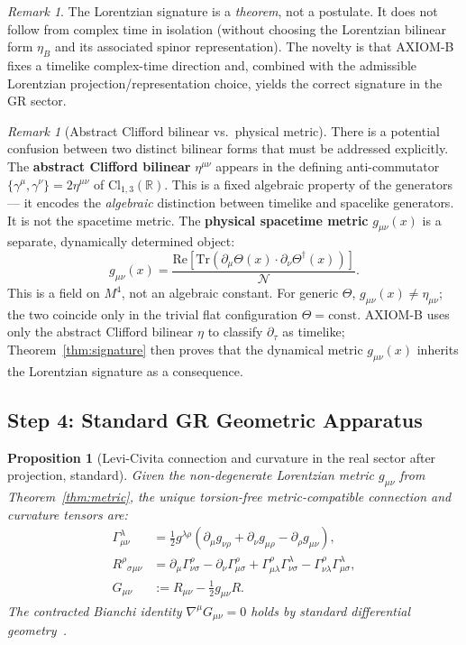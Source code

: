 \documentclass[12pt,a4paper]{article}
\newtheorem{proposition}[theorem]{Proposition}
\theoremstyle{definition}
\theoremstyle{remark}
\newtheorem{remark}[theorem]{Remark}
\newcommand{\RR}{\mathbb{R}}
\newcommand{\Tr}{\mathrm{Tr}}
\newcommand{\re}{\mathrm{Re}}
\newcommand{\calN}{\mathcal{N}}
\begin{document}
\begin{remark}
The Lorentzian signature is a \emph{theorem}, not a postulate.
It does not follow from complex time in isolation (without choosing the
Lorentzian bilinear form $\eta_B$ and its associated spinor representation).
The novelty is that AXIOM-B fixes a timelike complex-time direction and,
combined with the admissible Lorentzian projection/representation choice,
yields the correct signature in the GR sector.
\end{remark}

\begin{remark}[Abstract Clifford bilinear vs.\ physical metric]
\label{rem:clifford_vs_metric}
There is a potential confusion between two distinct bilinear forms that must
be addressed explicitly.
The \textbf{abstract Clifford bilinear} $\eta^{\mu\nu}$ appears in the
defining anti-commutator $\{\gamma^\mu,\gamma^\nu\} = 2\eta^{\mu\nu}$ of
$\mathrm{Cl}_{1,3}(\RR)$.
This is a fixed algebraic property of the generators --- it encodes the
\emph{algebraic} distinction between timelike and spacelike generators.
It is not the spacetime metric.
The \textbf{physical spacetime metric} $g_{\mu\nu}(x)$ is a separate,
dynamically determined object:
\[
  g_{\mu\nu}(x)
  = \frac{\re[\Tr(\partial_\mu\Theta(x) \cdot \partial_\nu\Theta^\dagger(x))]}{\calN}.
\]
This is a field on $M^4$, not an algebraic constant.
For generic $\Theta$, $g_{\mu\nu}(x) \neq \eta_{\mu\nu}$; the two coincide
only in the trivial flat configuration $\Theta = \mathrm{const}$.
AXIOM-B uses only the abstract Clifford bilinear $\eta$ to classify
$\partial_\tau$ as timelike; Theorem~\ref{thm:signature} then proves that
the dynamical metric $g_{\mu\nu}(x)$ inherits the Lorentzian signature
as a consequence.
\end{remark}

\subsection{Step 4: Standard GR Geometric Apparatus}
\label{sec:step4}

\begin{proposition}[Levi-Civita connection and curvature in the real sector after projection, standard]
\label{prop:geometry}
Given the non-degenerate Lorentzian metric $g_{\mu\nu}$ from
Theorem~\ref{thm:metric}, the unique torsion-free metric-compatible connection
and curvature tensors are:
\begin{align}
  \Gamma^\lambda_{\mu\nu}
    &= \tfrac{1}{2}g^{\lambda\rho}
       (\partial_\mu g_{\nu\rho} + \partial_\nu g_{\mu\rho}
        - \partial_\rho g_{\mu\nu}), \\
  R^\rho{}_{\sigma\mu\nu}
    &= \partial_\mu\Gamma^\rho_{\nu\sigma}
       - \partial_\nu\Gamma^\rho_{\mu\sigma}
       + \Gamma^\rho_{\mu\lambda}\Gamma^\lambda_{\nu\sigma}
       - \Gamma^\rho_{\nu\lambda}\Gamma^\lambda_{\mu\sigma}, \\
  G_{\mu\nu}
    &:= R_{\mu\nu} - \tfrac{1}{2}g_{\mu\nu}R.
\end{align}
The contracted Bianchi identity $\nabla^\mu G_{\mu\nu} = 0$ holds by standard
differential geometry~\cite{wald1984,mtw1973}.
\end{proposition}
\end{document}
